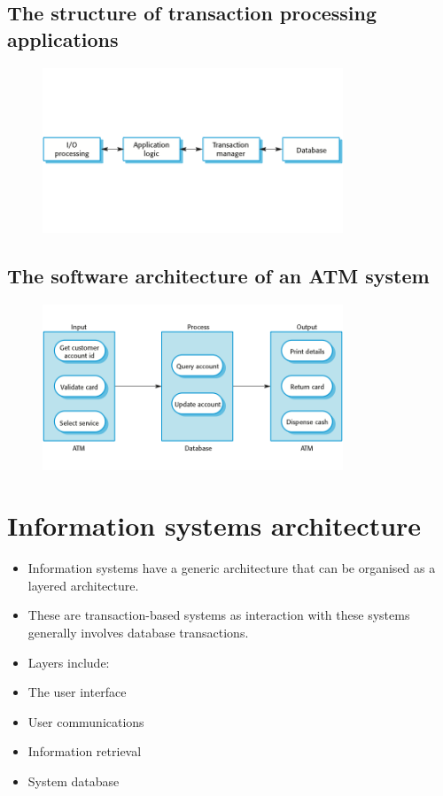 \subsection{The structure of transaction processing applications}
\begin{figure}[h!]
    \centering
    \includegraphics[width = 0.8\textwidth]{./figures/L3_9.png}
    \caption{}
    \label{fig:L3_9}
\end{figure}




\subsection{The software architecture of an ATM system}
\begin{figure}[h!]
    \centering
    \includegraphics[width = 0.8\textwidth]{./figures/L3_10.png}
    \caption{}
    \label{fig:L3_10}
\end{figure}


\section{Information systems architecture}
\begin{itemize}
\item Information systems have a generic architecture that can be organised as a layered architecture.

\item These are transaction-based systems as interaction with these systems generally involves database transactions.

\item Layers include:  \item The user interface  \item User communications  \item Information retrieval  \item System database

\end{itemize}
